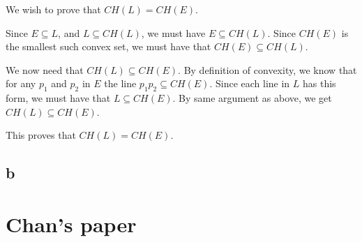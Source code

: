 \documentclass[11pt,a4paper]{article}
\begin{document}
We wish to prove that $CH(L) = CH(E)$.

Since $E \subseteq L$, and $L \subseteq CH(L)$, we must have $E \subseteq CH(L)$. Since
$CH(E)$ is the smallest such convex set, we must have that $CH(E) \subseteq CH(L)$.

We now need that $CH(L) \subseteq CH(E)$. By definition of convexity, we know that for any
$p_1$ and $p_2$ in $E$ the line $p_1p_2 \subseteq CH(E)$. Since each line in $L$ has this
form, we must have that $L \subseteq CH(E)$. By same argument as above, we get $CH(L) \subseteq CH(E)$.

This proves that $CH(L) = CH(E)$.

\subsection{b}

\section{Chan's paper}
\end{document}
